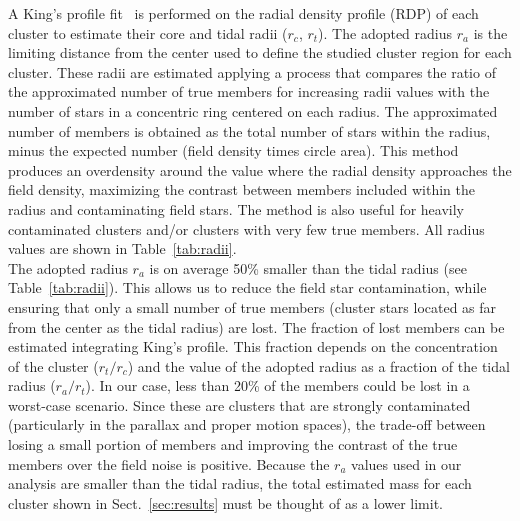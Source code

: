 \documentclass{aa}
\begin{document}
  A King's profile fit~\citep{King_1962}  is performed on the radial
  density profile (RDP) of each cluster to estimate their core and
  tidal radii ($r_{c}$, $r_{t}$). The adopted radius $r_{a}$ is the limiting
  distance from the center used to define the studied cluster region for each
  cluster. These radii are estimated applying a process that compares the
  ratio of the approximated number of true members for increasing radii values
  with the number of stars in a concentric ring centered on each radius. The
  approximated number of members is obtained as the total number of stars within
  the radius, minus the expected number (field density times circle area). This
  method produces an overdensity around the value where the radial density
  approaches the field density, maximizing the contrast between members included
  within the radius and contaminating field stars. The method is also useful
  for heavily contaminated clusters and/or clusters with very few true
  members. All radius values are shown in Table~\ref{tab:radii}.\\

  The adopted radius $r_{a}$ is on average 50\% smaller than the
  tidal radius (see Table~\ref{tab:radii}). This allows us to reduce the field star contamination, while ensuring that only a small number of
  true members (cluster stars located as far from the center as the tidal
  radius) are lost.
  The fraction of lost members can be estimated integrating King's profile. This
  fraction depends on the concentration of the cluster ($r_{t}/r_{c}$) and the
  value of the adopted radius as a fraction of the tidal radius ($r_{a}/r_{t}$).
  In our case, less than 20\% of the members could be lost in a worst-case
  scenario. Since these are clusters that are strongly contaminated 
  (particularly in the parallax and proper motion spaces), the trade-off
  between losing a small portion of members and improving the contrast of the
  true members over the field noise is positive.
  Because the $r_{a}$ values used in our analysis are smaller than the tidal radius,
   the total estimated mass for each cluster shown in
  Sect.~\ref{sec:results} must be thought of as a lower limit.\\
\end{document}
